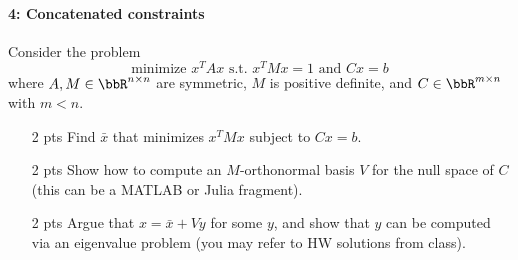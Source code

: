 \documentclass[12pt, leqno]{article} %
\begin{document}
\paragraph*{4: Concatenated constraints}
Consider the problem
\[
  \mbox{minimize } x^T A x \mbox{ s.t. } x^T M x = 1 \mbox{ and } Cx = b
\]
where $A, M \in \bbR^{n \times n}$ are symmetric, $M$ is positive definite, and $C \in
\bbR^{m \times n}$ with $m < n$.
\begin{itemize}
\item[2 pts] Find $\bar{x}$ that minimizes $x^T M x$ subject to $Cx = b$.
\item[2 pts] Show how to compute an $M$-orthonormal basis $V$ for the 
  null space of $C$ (this can be a MATLAB or Julia fragment).
\item[2 pts] Argue that $x = \bar{x} + Vy$ for some $y$,
  and show that $y$ can be computed via an eigenvalue problem
  (you may refer to HW solutions from class).
\end{itemize}
\end{document}
